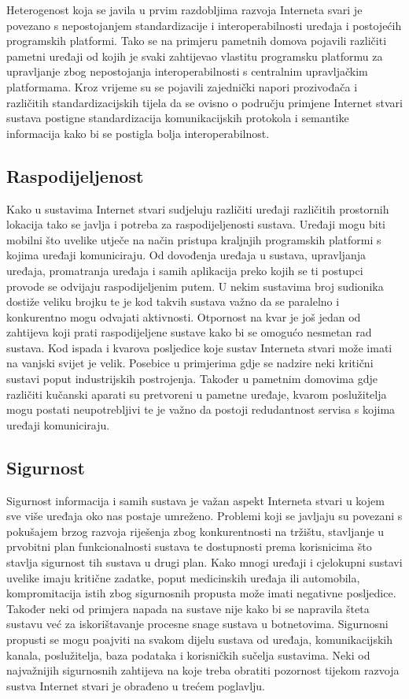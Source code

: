 \documentclass[times, utf8, diplomski]{fer}
\begin{document}
Heterogenost koja se javila u prvim razdobljima razvoja Interneta svari je povezano s nepostojanjem standardizacije i interoperabilnosti uređaja i postojećih programskih platformi. Tako se na primjeru pametnih domova pojavili različiti pametni uređaji od kojih je svaki zahtijevao vlastitu programsku platformu za upravljanje zbog nepostojanja interoperabilnosti s centralnim upravljačkim platformama. Kroz vrijeme su se pojavili zajednički napori prozivođača i različitih standardizacijskih tijela da se ovisno o području primjene Internet stvari sustava postigne standardizacija komunikacijskih protokola i semantike informacija kako bi se postigla bolja interoperabilnost.

\subsection{Raspodijeljenost}
Kako u sustavima Internet stvari sudjeluju različiti uređaji različitih prostornih lokacija tako se javlja i potreba za raspodijeljenosti sustava. Uređaji mogu biti mobilni što uvelike utječe na način pristupa kraljnjih programskih platformi s kojima uređaji komuniciraju. Od dovođenja uređaja u sustava, upravljanja uređaja, promatranja uređaja i samih aplikacija preko kojih se ti postupci provode se odvijaju raspodijeljenim putem. U nekim sustavima broj sudionika dostiže veliku brojku te je kod takvih sustava važno da se paralelno i konkurentno mogu odvajati aktivnosti. Otpornost na kvar je još jedan od zahtijeva koji prati raspodijeljene sustave kako bi se omogućo nesmetan rad sustava. Kod ispada i kvarova posljedice koje sustav Interneta stvari može imati na vanjski svijet je velik. Posebice u primjerima gdje se nadzire neki kritični sustavi poput industrijskih postrojenja. Također u pametnim domovima gdje različiti kučanski aparati su pretvoreni u pametne uređaje, kvarom poslužitelja mogu postati neupotrebljivi te je važno da postoji redudantnost servisa s kojima uređaji komuniciraju.

\subsection{Sigurnost}
Sigurnost informacija i samih sustava je važan aspekt Interneta stvari u kojem sve više uređaja oko nas postaje umreženo. Problemi koji se javljaju su povezani s pokušajem brzog razvoja riješenja zbog konkurentnosti na tržištu, stavljanje u prvobitni plan funkcionalnosti sustava te dostupnosti prema korisnicima što stavlja sigurnost tih sustava u drugi plan. Kako mnogi uređaji i cjelokupni sustavi uvelike imaju kritične zadatke, poput medicinskih uređaja ili automobila, kompromitacija istih zbog sigurnosnih propusta može imati negativne posljedice. Također neki od primjera napada na sustave nije kako bi se napravila šteta sustavu već za iskorištavanje procesne snage sustava u botnetovima. Sigurnosni propusti se mogu poajviti na svakom dijelu sustava od uređaja, komunikacijskih kanala, poslužitelja, baza podataka i korisničkih sučelja sustavima. Neki od najvažnijih sigurnosnih zahtijeva na koje treba obratiti pozornost tijekom razvoja sustva Internet stvari je obrađeno u trećem poglavlju.
\end{document}
